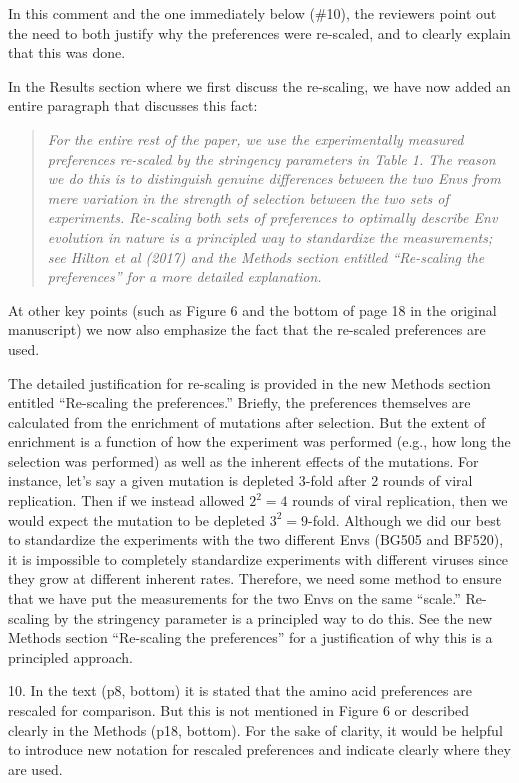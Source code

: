 \documentclass[11pt, oneside]{article}   	%
\begin{document}
{\color{black}
In this comment and the one immediately below (\#10), the reviewers point out the need to both justify why the preferences were re-scaled, and to clearly explain that this was done.

In the Results section where we first discuss the re-scaling, we have now added an entire paragraph that discusses this fact:
\begin{quote}
\textsl{For the entire rest of the paper, we use the experimentally measured preferences re-scaled by the stringency parameters in Table 1.
The reason we do this is to distinguish genuine differences between the two Envs from mere variation in the strength of selection between the two sets of experiments.
Re-scaling both sets of preferences to optimally describe Env evolution in nature is a principled way to standardize the measurements; see Hilton et al (2017) and the Methods section entitled ``Re-scaling the preferences'' for a more detailed explanation.}
\end{quote}
At other key points (such as Figure 6 and the bottom of page 18 in the original manuscript) we now also emphasize the fact that the re-scaled preferences are used.

The detailed justification for re-scaling is provided in the new Methods section entitled ``Re-scaling the preferences.''
Briefly, the preferences themselves are calculated from the enrichment of mutations after selection.
But the extent of enrichment is a function of how the experiment was performed (e.g., how long the selection was performed) as well as the inherent effects of the mutations. 
For instance, let's say a given mutation is depleted 3-fold after 2 rounds of viral replication. 
Then if we instead allowed $2^2 = 4$ rounds of viral replication, then we would expect the mutation to be depleted $3^2 = 9$-fold.
Although we did our best to standardize the experiments with the two different Envs (BG505 and BF520), it is impossible to completely standardize experiments with different viruses since they grow at different inherent rates.
Therefore, we need some method to ensure that we have put the measurements for the two Envs on the same ``scale.''
Re-scaling by the stringency parameter is a principled way to do this.
See the new Methods section ``Re-scaling the preferences'' for a justification of why this is a principled approach.
}

10. In the text (p8, bottom) it is stated that the amino acid preferences are rescaled for comparison. But this is not mentioned in Figure 6 or described clearly in the Methods (p18, bottom). For the sake of clarity, it would be helpful to introduce new notation for rescaled preferences and indicate clearly where they are used. 
\end{document}
